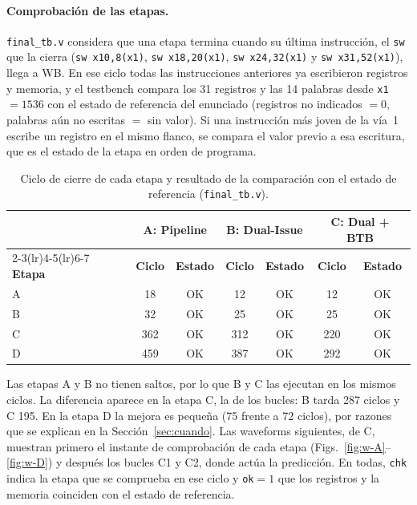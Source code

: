 \documentclass[12pt,a4paper]{article}
\newcommand{\sig}[1]{\texttt{#1}}
\begin{document}
\paragraph{Comprobación de las etapas.} \texttt{final\_tb.v} considera que una etapa termina cuando su última instrucción, el \texttt{sw} que la cierra (\texttt{sw x10,8(x1)}, \texttt{sw x18,20(x1)}, \texttt{sw x24,32(x1)} y \texttt{sw x31,52(x1)}), llega a WB. En ese ciclo todas las instrucciones anteriores ya escribieron registros y memoria, y el testbench compara los 31 registros y las 14 palabras desde \texttt{x1}$=1536$ con el estado de referencia del enunciado (registros no indicados $= 0$, palabras aún no escritas $=$ sin valor). Si una instrucción más joven de la vía~1 escribe un registro en el mismo flanco, se compara el valor previo a esa escritura, que es el estado de la etapa en orden de programa.

\begin{table}[H]
\centering
\small
\begin{tabular}{lcccccc}
\toprule
& \multicolumn{2}{c}{\textbf{A: Pipeline}} & \multicolumn{2}{c}{\textbf{B: Dual-Issue}} & \multicolumn{2}{c}{\textbf{C: Dual + BTB}} \\
\cmidrule(lr){2-3}\cmidrule(lr){4-5}\cmidrule(lr){6-7}
\textbf{Etapa} & \textbf{Ciclo} & \textbf{Estado} & \textbf{Ciclo} & \textbf{Estado} & \textbf{Ciclo} & \textbf{Estado} \\
\midrule
A & 18  & OK & 12  & OK & 12  & OK \\
B & 32  & OK & 25  & OK & 25  & OK \\
C & 362 & OK & 312 & OK & 220 & OK \\
D & 459 & OK & 387 & OK & 292 & OK \\
\bottomrule
\end{tabular}
\caption{Ciclo de cierre de cada etapa y resultado de la comparación con el estado de referencia (\texttt{final\_tb.v}).}
\label{tab:etapas}
\end{table}

Las etapas A y B no tienen saltos, por lo que B y C las ejecutan en los mismos ciclos. La diferencia aparece en la etapa C, la de los bucles: B tarda 287 ciclos y C 195. En la etapa D la mejora es pequeña (75 frente a 72 ciclos), por razones que se explican en la Sección~\ref{sec:cuando}. Las waveforms siguientes, de C, muestran primero el instante de comprobación de cada etapa (Figs.~\ref{fig:w-A}--\ref{fig:w-D}) y después los bucles C1 y C2, donde actúa la predicción. En todas, \sig{chk} indica la etapa que se comprueba en ese ciclo y \sig{ok}$=1$ que los registros y la memoria coinciden con el estado de referencia.
\end{document}
